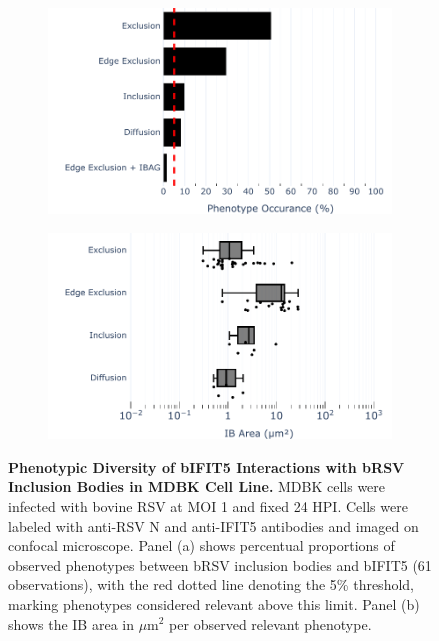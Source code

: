 \begin{figure}
    \begin{subfigure}{0.495\textwidth}
        \caption{}
        \includegraphics[width=1\linewidth]{08. Chapter 3/Figs/02. Infection/04. IFIT5/07. bar_i5_mdbk.pdf} 
    \end{subfigure}
    \begin{subfigure}{0.495\textwidth}
        \caption{}
        \includegraphics[width=1\linewidth]{08. Chapter 3/Figs/02. Infection/04. IFIT5/08. box_i5_mdbk.pdf}
    \end{subfigure}
    \caption[Phenotypic Diversity of bIFIT5 Interactions with bRSV Inclusion Bodies in MDBK Cell Line.]{\textbf{Phenotypic Diversity of bIFIT5 Interactions with bRSV Inclusion Bodies in MDBK Cell Line.} MDBK cells were infected with bovine RSV at MOI 1 and fixed 24 HPI. Cells were labeled with anti-RSV N and anti-IFIT5 antibodies and imaged on confocal microscope. Panel (a) shows percentual proportions of observed phenotypes between bRSV inclusion bodies and bIFIT5 (61 observations), with the red dotted line denoting the 5\% threshold, marking phenotypes considered relevant above this limit. Panel (b) shows the IB area in \(\mu \mbox{m}^2\) per observed relevant phenotype.}
    \label{fig:Phenotypic Diversity of bIFIT5 Interactions with bRSV Inclusion Bodies in MDBK Cell Line}
\end{figure}

